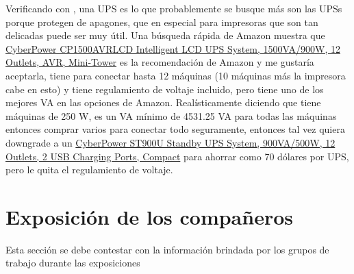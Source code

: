 \documentclass[stu, 12pt, letterpaper, donotrepeattitle, floatsintext, natbib, helv]{apa7}
\begin{document}
\begin{enumerate}
    Verificando con , una UPS es lo que probablemente se busque más son las UPSs porque protegen de apagones, que en especial para impresoras que son tan delicadas puede ser muy útil. Una búsqueda rápida de Amazon muestra que \href{https://www.amazon.com/CyberPower-CP1500AVRLCD-Intelligent-Outlets-Mini-Tower/dp/B000FBK3QK/ref=sr_1_4?crid=1XFT4950W6LAN&keywords=UPS&qid=1655930639&sprefix=ups%2Caps%2C168&sr=8-4&th=1}{CyberPower CP1500AVRLCD Intelligent LCD UPS System, 1500VA/900W, 12 Outlets, AVR, Mini-Tower} es la recomendación de Amazon y me gustaría aceptarla, tiene para conectar hasta 12 máquinas (10 máquinas más la impresora cabe en esto) y tiene regulamiento de voltaje incluido, pero tiene uno de los mejores VA en las opciones de Amazon. Realísticamente diciendo que tiene máquinas de 250 W, es un VA mínimo de 4531.25 VA para todas las máquinas entonces comprar varios para conectar todo seguramente, entonces tal vez quiera downgrade a un \href{https://www.amazon.com/CyberPower-ST900U-Standby-Outlets-Charging/dp/B07GZT2QW7/ref=sr_1_3_mod_primary_new?crid=32M201SGL1VBR&keywords=UPS%2B10%2Boutlet&qid=1655931514&sbo=RZvfv%2F%2FHxDF%2BO5021pAnSA%3D%3D&sprefix=ups%2B10%2Boutlet%2Caps%2C150&sr=8-3&th=1}{CyberPower ST900U Standby UPS System, 900VA/500W, 12 Outlets, 2 USB Charging Ports, Compact} para ahorrar como 70 dólares por UPS, pero le quita el regulamiento de voltaje.
\end{enumerate}
\section*{Exposición de los compañeros}
{}

Esta sección se debe contestar con la información brindada por los grupos de trabajo durante las exposiciones
\end{document}
